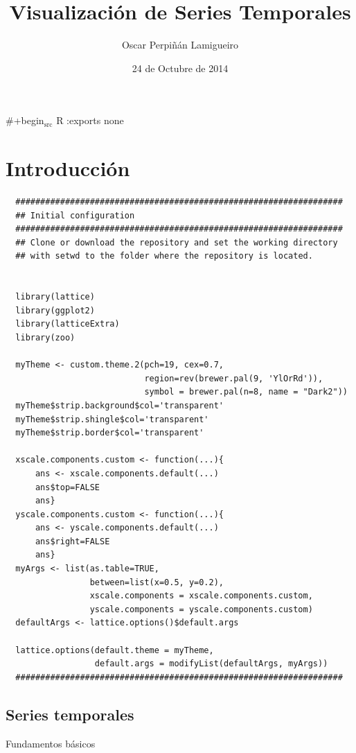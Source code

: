 \documentclass[xcolor={usenames,svgnames,dvipsnames}]{beamer}
\author{Oscar Perpiñán Lamigueiro}
\date{24 de Octubre de 2014}
\title{Visualización de Series Temporales}
\begin{document}
\maketitle
\#+begin$_{\text{src}}$ R :exports none  

\section{Introducción}
\label{sec-1}

\lstset{language=R,label= ,caption= ,numbers=none}
\begin{lstlisting}
  ##################################################################
  ## Initial configuration
  ##################################################################
  ## Clone or download the repository and set the working directory
  ## with setwd to the folder where the repository is located.
  
 
  library(lattice)
  library(ggplot2)
  library(latticeExtra)
  library(zoo)
  
  myTheme <- custom.theme.2(pch=19, cex=0.7,
                            region=rev(brewer.pal(9, 'YlOrRd')),
                            symbol = brewer.pal(n=8, name = "Dark2"))
  myTheme$strip.background$col='transparent'
  myTheme$strip.shingle$col='transparent'
  myTheme$strip.border$col='transparent'
  
  xscale.components.custom <- function(...){
      ans <- xscale.components.default(...)
      ans$top=FALSE
      ans}
  yscale.components.custom <- function(...){
      ans <- yscale.components.default(...)
      ans$right=FALSE
      ans}
  myArgs <- list(as.table=TRUE,
                 between=list(x=0.5, y=0.2),
                 xscale.components = xscale.components.custom,
                 yscale.components = yscale.components.custom)
  defaultArgs <- lattice.options()$default.args
  
  lattice.options(default.theme = myTheme,
                  default.args = modifyList(defaultArgs, myArgs))
  ##################################################################
\end{lstlisting}


\subsection{Series temporales}
\label{sec-1-1}
\begin{frame}[label=sec-1-1-1]{Fundamentos básicos}
\end{frame}
\end{document}
